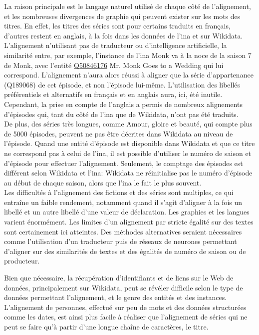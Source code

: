 La raison principale est le langage naturel utilisé de chaque côté de l'alignement, et les nombreuses divergences de graphie qui peuvent exister sur les mots des titres. En effet, les titres des séries sont pour certains traduits en français, d'autres restent en anglais, à la fois dans les données de l'\ac{ina} et sur Wikidata. L'alignement n'utilisant pas de traducteur ou d'intelligence artificielle, la similarité entre, par exemple, l'instance de l'\ac{ina} \og Monk va à la noce\fg{} de la saison 7 de Monk, avec l'entité \href{https://www.wikidata.org/wiki/Q50846176}{Q50846176} \og Mr. Monk Goes to a Wedding\fg{} qui lui correspond. L'alignement n'aura alors réussi à aligner que la série d'appartenance (Q189068) de cet épisode, et non l'épisode lui-même. L'utilisation des libellés préférentiels et alternatifs en français et en anglais aura, ici, été inutile. Cependant, la prise en compte de l'anglais a permis de nombreux alignements d'épisodes qui, tant du côté de l'\ac{ina} que de Wikidata, n'ont pas été traduits.\\

De plus, des séries très longues, comme \og Amour, gloire et beauté\fg{}, qui compte plus de 5000 épisodes, peuvent ne pas être décrites dans Wikidata au niveau de l'épisode. Quand une entité d'épisode est disponible dans Wikidata et que ce titre ne correspond pas à celui de l'\ac{ina}, il est possible d'utiliser le numéro de saison et d'épisode pour effectuer l'alignement. Seulement, le comptage des épisodes est différent selon Wikidata et l'\ac{ina}: Wikidata ne réinitialise pas le numéro d'épisode au début de chaque saison, alors que l'\ac{ina} le fait le plus souvent.\\

Les difficultés à l'alignement des fictions et des séries sont multiples, ce qui entraîne un faible rendement, notamment quand il s'agit d'aligner à la fois un libellé et un autre libellé d'une valeur de déclaration. Les graphies et les langues varient énormément. Les limites d'un alignement par stricte égalité sur des textes sont certainement ici atteintes. Des méthodes alternatives seraient nécessaires comme l'utilisation d'un traducteur puis de réseaux de neurones permettant d'aligner sur des similarités de textes et des égalités de numéro de saison ou de producteur.

\bigskip
\bigskip
Bien que nécessaire, la récupération d'identifiants et de liens sur le Web de données, principalement sur Wikidata, peut se révéler difficile selon le type de données permettant l'alignement, et le genre des entités et des instances. L'alignement de personnes, effectué sur peu de mots et des données structurées comme les dates, est ainsi plus facile à réaliser que l'alignement de séries qui ne peut se faire qu'à partir d'une longue chaîne de caractères, le titre.